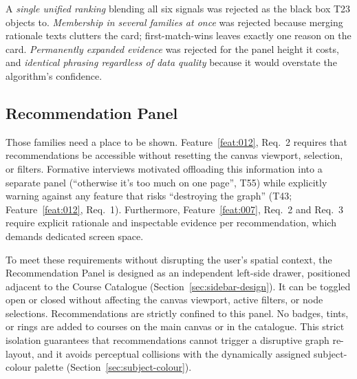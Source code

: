 A \emph{single unified ranking} blending all six signals was rejected as the black box T23 objects to. \emph{Membership in several families at once} was rejected because merging rationale texts clutters the card; first-match-wins leaves exactly one reason on the card. \emph{Permanently expanded evidence} was rejected for the panel height it costs, and \emph{identical phrasing regardless of data quality} because it would overstate the algorithm's confidence.


\subsection{Recommendation Panel}
\label{sec:rec-panel}
Those families need a place to be shown. Feature~\ref{feat:012}, Req.~2 requires that recommendations be accessible without resetting the canvas viewport, selection, or filters. Formative interviews motivated offloading this information into a separate panel (\enquote{otherwise it's too much on one page}, T55) while explicitly warning against any feature that risks \enquote{destroying the graph} (T43; Feature~\ref{feat:012}, Req.~1). Furthermore, Feature~\ref{feat:007}, Req.~2 and Req.~3 require explicit rationale and inspectable evidence per recommendation, which demands dedicated screen space. 

To meet these requirements without disrupting the user's spatial context, the Recommendation Panel is designed as an independent left-side drawer, positioned adjacent to the Course Catalogue (Section~\ref{sec:sidebar-design}). It can be toggled open or closed without affecting the canvas viewport, active filters, or node selections. Recommendations are strictly confined to this panel. No badges, tints, or rings are added to courses on the main canvas or in the catalogue. This strict isolation guarantees that recommendations cannot trigger a disruptive graph re-layout, and it avoids perceptual collisions with the dynamically assigned subject-colour palette (Section~\ref{sec:subject-colour}). 

